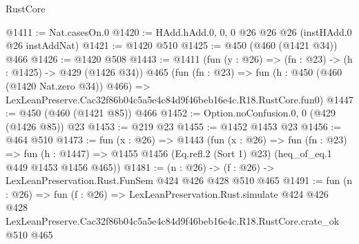 \begin{lexlean}{RustCore}
\begin{coremodule}
@1411 := Nat.casesOn.{0}
@1420 := HAdd.hAdd.{0, 0, 0} @26 @26 @26 (instHAdd.{0} @26 instAddNat)
@1421 := @1420 @510
@1425 := @450 (@460 (@1421 @34)) @466
@1426 := @1420 @508
@1443 := @1411
    (fun (y : @26) => (fn : @23) -> (h : @1425) -> @429 (@1426 @34))
    @465
    (fun (fn : @23) =>
    fun (h : @450 (@460 (@1420 Nat.zero @34)) @466) =>
    LexLeanPreserve.Cac32f86b04c5a5e4c84d9f46beb16e4c.R18.RustCore.fun0)
@1447 := @450 (@460 (@1421 @85)) @466
@1452 := Option.noConfusion.{0, 0} (@429 (@1426 @85)) @23
@1453 := @219 @23
@1455 := @1452 @1453 @23
@1456 := @464 @510
@1473 := fun (x : @26) =>
  @1443
    (fun (x : @26) =>
    fun (fn : @23) =>
    fun (h : @1447) => @1455 @1456 (Eq.refl.{2} (Sort 1) @23) (heq_of_eq.{1} @449 @1453 @1456 @465))
@1481 := (n : @26) -> (f : @26) -> LexLeanPreservation.Rust.FunSem @424 @426 @428 @510 @465
@1491 := fun (n : @26) =>
  fun (f : @26) =>
  LexLeanPreservation.Rust.simulate
    @424
    @426
    @428
    LexLeanPreserve.Cac32f86b04c5a5e4c84d9f46beb16e4c.R18.RustCore.crate_ok
    @510
    @465
\end{coremodule}
\end{lexlean}
